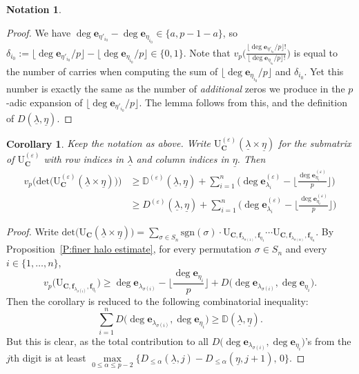 \documentclass[12pt]{amsart}
\newtheorem{corollary}[subsection]{Corollary}
\theoremstyle{definition}
\newtheorem{notation}[subsection]{Notation}
\numberwithin{equation}{subsection}
\def\DD{\mathbb{D}}
\def\bfe{\mathbf{e}}
\def\bff{\mathbf{f}}
\def\bfC{\mathbf{C}}
\def\rmU{\mathrm{U}}
\renewcommand{\det}{\mathrm{det}}
\newcommand{\sgn}{\mathrm{sgn}}
\begin{document}
\begin{notation}
\begin{proof}
We have $\deg\bfe_{\eta'_{i_0}}-\deg\bfe_{\eta_{i_0}}\in \{a,p-1-a \}$, so $\delta_{i_0}:= \lfloor\deg\bfe_{\eta'_{i_0}}/p\rfloor-\lfloor\deg\bfe_{\eta_{i_0}}/p\rfloor\in \{0,1\}$.
Note that $v_p\Big( \frac{\lfloor \deg\bfe_{\eta'_{i_0}}/p\rfloor! }{\lfloor \deg\bfe_{\eta_{i_0}}/p\rfloor!}\Big)$ is equal to the number of carries when computing the sum of $\lfloor \deg\bfe_{\eta_{i_0}}/p\rfloor$ and $\delta_{i_0}$. Yet this number is exactly the same as the number of \emph{additional} zeros we produce in the $p$-adic expansion of $\lfloor \deg\bfe_{\eta'_{i_0}}/p\rfloor$. The lemma follows from this, and the definition of $D(\underline \lambda, \underline \eta)$.
\end{proof}



\end{notation}
\begin{corollary}
\label{C:refined halo estimate}
Keep the notation as above. Write $\rmU^{(\varepsilon)}_{\bfC}(\underline \lambda \times \underline \eta)$ for the submatrix of $\rmU^{(\varepsilon)}_{\bfC}$ with row indices in $\underline \lambda$ and column indices in $\underline \eta$. Then
\begin{align}
\label{E:refined halo}
v_p\big(\det \big( \rmU^{(\varepsilon)}_{\bfC}(\underline \lambda \times \underline \eta)\big) \big) &\geq \DD^{(\varepsilon)}(\underline \lambda, \underline \eta) + \sum_{i=1}^n \Big(\deg \bfe^{(\varepsilon)}_{\lambda_i} - \Big\lfloor \frac{\deg \bfe^{(\varepsilon)}_{\eta_i}}p \Big\rfloor\Big)\\
&\geq D^{(\varepsilon)}(\underline \lambda, \underline \eta) + \sum_{i=1}^n \Big(\deg \bfe^{(\varepsilon)}_{\lambda_i} - \Big\lfloor \frac{\deg \bfe^{(\varepsilon)}_{\eta_i}}p \Big\rfloor\Big)\nonumber
\end{align}
\end{corollary}

\begin{proof}
Write $\det \big(\rmU_\bfC(\underline \lambda \times \underline \eta)\big) = \sum\limits_{ \sigma \in S_n}\sgn(\sigma)\cdot \rmU_{\bfC,\bff_{\lambda_{\sigma(1)}}, \bff_{\eta_1}}\cdots \rmU_{\bfC,\bff_{\lambda_{\sigma(n)}}, \bff_{\eta_n}}$. By Proposition~\ref{P:finer halo estimate}, for every permutation $\sigma \in S_n$ and every $i \in \{1,\dots, n\}$,
$$
v_p \big( \rmU_{\bfC,\bff_{\lambda_{\sigma(i)}}, \bff_{\eta_{i}}} \big) \geq\deg \bfe_{\lambda_{\sigma(i)}} - \Big\lfloor \frac{\deg \bfe_{\eta_i}}p \Big\rfloor +D\big(\deg \bfe_{\lambda_{\sigma(i)}},\deg \bfe_{\eta_{i}}\big).
$$
Then the corollary is reduced to the following combinatorial inequality:
$$
\sum_{i=1}^n D\big(\deg \bfe_{\lambda_{\sigma(i)}},\deg \bfe_{\eta_{i}}\big) \geq \DD(\underline \lambda, \underline \eta).
$$
But this is clear, as the total contribution to all $D\big(\deg \bfe_{\lambda_{\sigma(i)}},\deg \bfe_{\eta_{i}}\big)$'s from the $j$th digit is at least $ \max\limits_{0\leq \alpha\leq p-2} \big\{D_{\leq \alpha}(\underline \lambda, j) -D_{\leq\alpha}(\underline \eta, j+1) ,\,0 \big\}$.
\end{proof}
\end{document}
